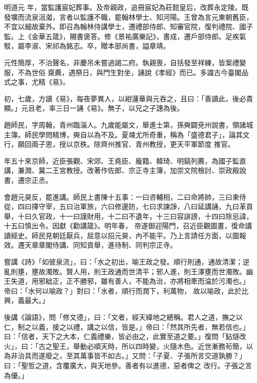 \begin{pinyinscope}
 明道元
 年，當監護宸妃葬事。及帝親政，追冊宸妃為莊懿皇后，改葬永定陵。既發壙而流泉沮洳，言者以監護不職，罷翰林學士、知河陽。王曾為言元東朝舊臣，不宜以細故棄外。即召為翰林侍講學士，遷禮部侍郎、知審官院，復判禮院、國子監。上《金華五箴》，賜書褒答。修《景祐廣樂記》，書成，遷戶部侍郎。足疾氣駁，屬李淑、宋祁為銘志。卒，贈本部尚書，謚章靖。



 元性簡厚，不治聲名，非慶吊未嘗過謁二府。執親喪，自括發至祥練，皆案禮變服，不為世俗
 齋薦，遇祭日，與門生對坐，誦說《孝經》而已。多識古今臺閣品式之事，尤精《易》。



 初，七歲，方讀《易》，每夜夢異人，以紺蓮華與元吞之，且曰：「善讀此，後必貴顯。」元且老，率三日一誦《易》。無子，以兄之子譓為後。



 趙師民，字周翰，青州臨淄人。九歲能屬文，舉進士第，孫奭闢兗州說書，領諸城主簿。師民學問精博，奭自以為不及。夏竦尤所奇重，稱為「盛德君子」，論其文行，願回兩子恩，授以京秩。除齊州推官、青州教授，更天平軍節度
 推官。



 年五十來京師，近臣張觀、宋郊、王堯臣、龐籍、韓琦、明鎬列薦，為國子監直講，兼潤、冀二王宮教授。改著作佐郎、宗正寺主簿，加崇文院檢討、崇政殿說書，遷宗正丞。



 會趙元昊反，罷進講。師民上書陳十五事：一曰咨輔相，二曰命將帥，三曰柬侍從，四曰擇守宰，五曰治軍旅，六曰修邊防，七曰求諫諍，八曰延講誦，九曰革貢舉，十曰久官政，十一曰謹財用，十二曰不遺年，十三曰容誹謗，十四曰除忌諱，十五曰慎出令。因獻《勸講箴》。明年春，
 帝遂御迎陽門，召近臣觀圖畫，復命講讀經史。師民見朝廷厭兵，屈意以招元昊，內不能平。乃上言請任方面，以圖報效。遷天章章閣侍講、同知貢舉，進待制、同判宗正寺。



 嘗講《詩》「如彼泉流」，曰：「水之初出，喻王政之發。順行則通，通故清潔；逆亂則壅，壅故濁敗。賢人用，則王政通而世清平；邪人進，則王澤壅而世濁敗。幽王失道，用邪絀正，正不勝邪，雖有善人，不能為治，亦將相牽而淪於污濁也。」帝曰：「水何以喻政？」對曰：「水者，順行而潤下，利萬物，
 故以喻政，此於比興，義最大。」



 後講《論語》，問「修文德」，曰：「文者，經天緯地之總稱。君人之道，撫之以仁，制之以義，接之以禮，講之以信，皆是。」帝曰：「然其所先者，無若信也。」曰：「信者，天下之大本，仁義禮樂，皆必由之，此實至道之要。」復問「鉆燧改火」，曰：「古之聖王，舉動必順天時，所以四時變，火隨木色。近世漸務茍簡，以為非治具而遂廢之，至其萬事皆不如古。」又問：「子夏、子張所言交道孰勝？」曰：「聖哲之道，含覆廣大，與天地參。善者有以進德，惡者俾之
 改行。子張之言為優。」




\end{pinyinscope}
